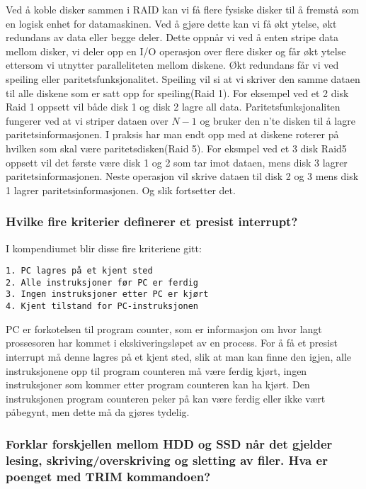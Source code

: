 \documentclass[11pt]{article}
\begin{document}
Ved å koble disker sammen i RAID kan vi få flere fysiske disker til å fremstå som en logisk enhet for datamaskinen. Ved å gjøre dette kan vi få økt ytelse, økt redundans av data eller begge deler. Dette oppnår vi ved å enten stripe data mellom disker, vi deler opp en I/O operasjon over flere disker og får økt ytelse ettersom vi utnytter paralleliteten mellom diskene. Økt redundans får vi ved speiling eller paritetsfunksjonalitet. Speiling vil si at vi skriver den samme dataen til alle diskene som er satt opp for speiling(Raid 1). For eksempel ved et 2 disk Raid 1 oppsett vil både disk 1 og disk 2 lagre all data. Paritetsfunksjonaliten fungerer ved at vi striper dataen over $N - 1$ og bruker den n'te disken til å lagre paritetsinformasjonen. I praksis har man endt opp med at diskene roterer på hvilken som skal være paritetsdisken(Raid 5). For eksmpel ved et 3 disk Raid5 oppsett vil det første være disk 1 og 2 som tar imot dataen, mens disk 3 lagrer paritetsinformasjonen. Neste operasjon vil skrive dataen til disk 2 og 3 mens disk 1 lagrer paritetsinformasjonen. Og slik fortsetter det.  

\subsubsection{Hvilke fire kriterier definerer et presist interrupt?}

I kompendiumet blir disse fire kriteriene gitt: \\ 
\begin{verbatim}
1. PC lagres på et kjent sted
2. Alle instruksjoner før PC er ferdig 
3. Ingen instruksjoner etter PC er kjørt 
4. Kjent tilstand for PC-instruksjonen
\end{verbatim}

PC er forkotelsen til program counter, som er informasjon om hvor langt prossesoren har kommet i ekskiveringsløpet av en process. For å få et presist interrupt må denne lagres på et kjent sted, slik at man kan finne den igjen, alle instruksjonene opp til program counteren må være ferdig kjørt, ingen instruksjoner som kommer etter program counteren kan ha kjørt. Den instruksjonen program counteren peker på kan være ferdig eller ikke vært påbegynt, men dette må da gjøres tydelig. 

\subsubsection{Forklar forskjellen mellom HDD og SSD når det gjelder lesing, skriving/overskriving og sletting av filer. Hva er poenget med TRIM kommandoen?}
\end{document}
